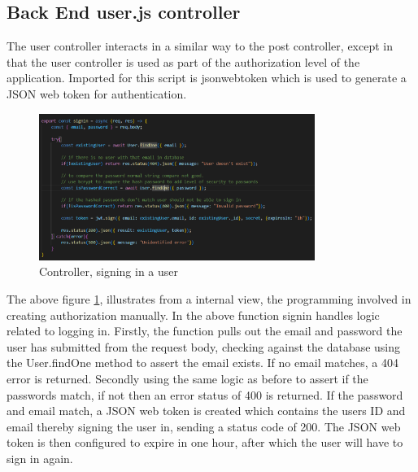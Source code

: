 \subsection{Back End user.js controller}
The user controller interacts in a similar way to the post controller, except in that the user controller is used as part of the authorization level of the application. Imported for this script is jsonwebtoken which is used to generate a JSON web token for authentication.
\begin{figure}[h!]
    \centering
    \includegraphics[width=0.8\textwidth]{images/signInCode.png}
    \caption{Controller, signing in a user}
    \label{image:signInCode}
\end{figure}
\newline
The above figure \ref{image:signInCode}, illustrates from a internal view, the programming involved in creating authorization manually. In the above function signin handles logic related to logging in. Firstly, the function pulls out the email and password the user has submitted from the request body, checking against the database using the User.findOne method to assert the email exists. If no email matches, a 404 error is returned. Secondly using the same logic as before to assert if the passwords match, if not then an error status of 400 is returned. If the password and email match, a JSON web token is created which contains the users ID and email thereby signing the user in, sending a status code of 200. The JSON web token is then configured to expire in one hour, after which the user will have to sign in again.

